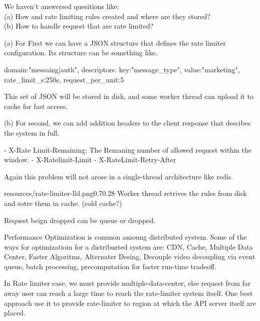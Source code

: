     We haven't answersed quesitions like:\\
     (a) How and rate limiting rules created and where are they stored?\\
     (b) How to handle request that are rate limited?

    (a) For First we can have a JSON structure that defines the rate limiter configuration. Its structure can be something like.
    \begin{code3}
        {
            domain:"messaing|auth",
            descriptors:
            {
                key:"message_type",
                value:"marketing",
                rate_limit_s:250s,
                request_per_unit:5
            }
        }
    \end{code3}

    This set of JSON will be stored in disk, and some worker thread can upload it to cache for fast access.

    (b) For second, we can add addition headers to the client response that descibes the system in full.
    \begin{code3}
        - X-Rate Limit-Remaining: The Remaning number of allowed request within the window.
        - X-Ratelimit-Limit
        - X-RateLimit-Retry-After
    \end{code3}

    
    Again this problem will not arose in a single-thread architecture like redis.

   \begin{lfigure}{resources/rate-limiter-lld.png}{0.7}{0.28}
    Worker thread retrives the rules from disk and sotre them in cache. (cold cache?)
    
    Request beign dropped can be queue or dropped.
   \end{lfigure}

    Performance Optimization is common amoung distributed system. Some of the ways for optimizatioin for a distriburted system are: CDN, Cache, Multiple Data Center, Faster Algoritms, Alternater Desing, Decouple video decoupling via event queue, batch processing, precomputation for faster run-time tradeoff.
    
    In Rate limiter case, we must provide multiple-data-center, else request from far away user can reach a large time to reach the rate-limiter system itself. One best approach use it to provide rate-limiter to region at which the API server itself are placed.


